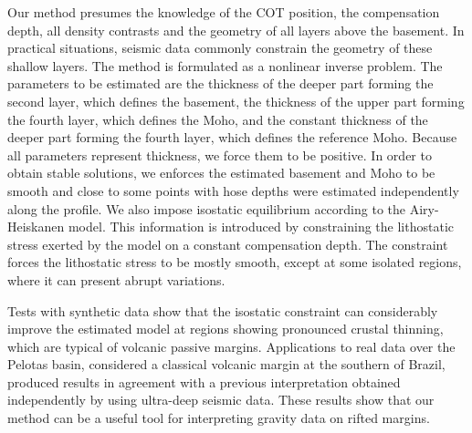 \documentclass[manuscript]{geophysics}
\begin{document}
Our method presumes the knowledge of the COT position, the compensation depth,
all density contrasts and the geometry of all layers above the basement.
In practical situations, 
seismic data commonly constrain the geometry of these shallow layers.
The method is formulated as a nonlinear inverse problem. 
The parameters to be estimated are the thickness of the deeper part forming the 
second layer, which defines the basement, the thickness of the upper part forming the 
fourth layer, which defines the Moho, and the constant thickness of the deeper part forming 
the fourth layer, which defines the reference Moho.
Because all parameters represent thickness, we force them to be positive.
In order to obtain stable solutions, we enforces the estimated basement and Moho to be 
smooth and close to some points with hose depths were estimated independently along the profile.
We also impose isostatic equilibrium according to the Airy-Heiskanen model.
This information is introduced by constraining the lithostatic stress
exerted by the model on a constant compensation depth. The constraint forces the
lithostatic stress to be mostly smooth, except at some isolated regions, where it can
present abrupt variations.

Tests with synthetic data show that the isostatic constraint can considerably improve 
the estimated model at regions showing pronounced crustal thinning, which 
are typical of volcanic passive margins. 
Applications to real data over the Pelotas basin, considered a classical volcanic
margin at the southern of Brazil, produced results in agreement with a previous 
interpretation obtained independently by using ultra-deep seismic data.
These results show that our method can be a useful tool for interpreting
gravity data on rifted margins.
\end{document}
